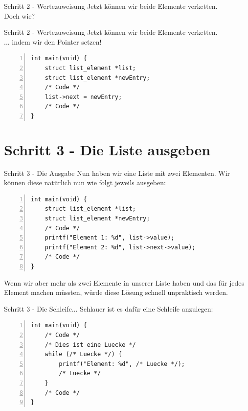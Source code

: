 \begin{frame}[fragile]{Schritt 2 - Wertezuweisung}
Jetzt können wir beide Elemente verketten. \\
\bigskip
Doch wie?
\end{frame}


\begin{frame}[fragile]{Schritt 2 - Wertezuweisung}
Jetzt können wir beide Elemente verketten. \\
\bigskip
... indem wir den Pointer setzen!
\begin{lstlisting}[numbers=left]
int main(void) {
    struct list_element *list;
    struct list_element *newEntry;
    /* Code */
    list->next = newEntry;
    /* Code */
}\end{lstlisting}

\end{frame}

\section{Schritt 3 - Die Liste ausgeben}

\begin{frame}[fragile]{Schritt 3 - Die Ausgabe}
Nun haben wir eine Liste mit zwei Elementen. Wir können diese natürlich nun wie folgt jeweils ausgeben: \\
\begin{lstlisting}[numbers=left]
int main(void) {
    struct list_element *list;
    struct list_element *newEntry;
    /* Code */
    printf("Element 1: %d", list->value);
    printf("Element 2: %d", list->next->value);
    /* Code */
}\end{lstlisting}
Wenn wir aber mehr als zwei Elemente in unserer Liste haben und das für jedes Element machen müssten, würde diese Lösung schnell unpraktisch werden.

\end{frame}


\begin{frame}[fragile]{Schritt 3 - Die Schleife...}
Schlauer ist es dafür eine Schleife anzulegen: \\
\begin{lstlisting}[numbers=left]
int main(void) {
    /* Code */
    /* Dies ist eine Luecke */
    while (/* Luecke */) {
        printf("Element: %d", /* Luecke */);
        /* Luecke */
    }
    /* Code */
}\end{lstlisting}
\end{frame}

